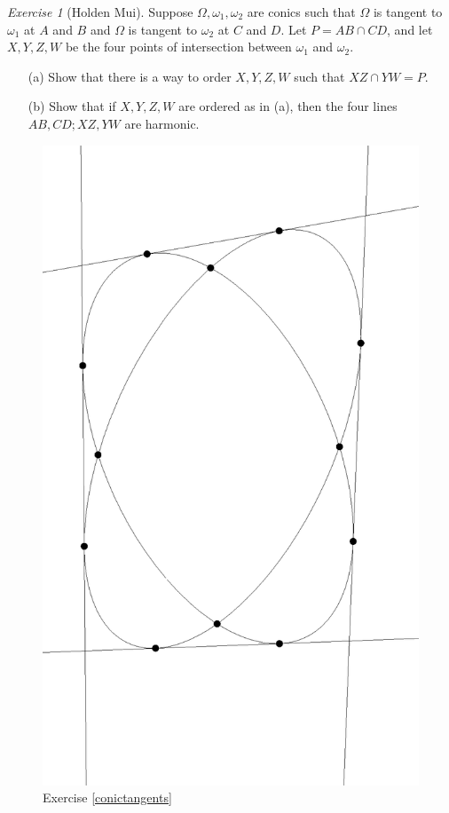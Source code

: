 \documentclass[letterpaper,11pt]{article}
\theoremstyle{definition}
\theoremstyle{remark}
\newtheorem{exer}{Exercise}
\begin{document}
\begin{exer}[Holden Mui] Suppose $\Omega, \omega_1, \omega_2$ are conics such that $\Omega$ is tangent to $\omega_1$ at $A$ and $B$ and $\Omega$ is tangent to $\omega_2$ at $C$ and $D$. Let $P = AB\cap CD$, and let $X,Y,Z,W$ be the four points of intersection between $\omega_1$ and $\omega_2$.
\begin{itemize}
\item[(a)] Show that there is a way to order $X,Y,Z,W$ such that $XZ \cap YW = P$.

\item[(b)] Show that if $X,Y,Z,W$ are ordered as in (a), then the four lines $AB, CD; XZ, YW$ are harmonic.
\end{itemize}
\end{exer}

\begin{figure}[!htb]
\centering
\includegraphics[scale=0.4,angle=270]{conictangents.eps}
\caption{Exercise \ref{conictangents}}
\end{figure}
\end{document}
